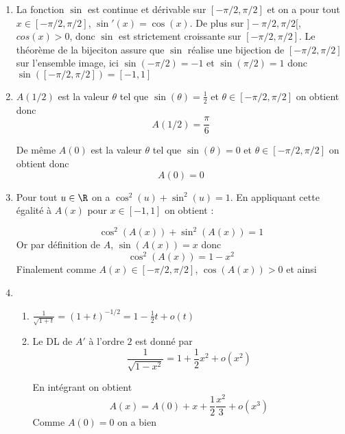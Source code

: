 \documentclass[a4paper, 11pt,reqno]{article}
\begin{document}
\begin{correction}
\begin{enumerate}
\item  La fonction $\sin$ est continue et dérivable sur $[-\pi/2,\pi/2]$ et on a pour tout $x\in [-\pi/2,\pi/2]$, $\sin'(x) =\cos(x)$. De plus sur $]-\pi/2,\pi/2[$, $cos(x)> 0$, donc $\sin$ est strictement croissante sur $[-\pi/2,\pi/2]$. 
Le théorème de la bijeciton assure que $\sin$ réalise une bijection de $[-\pi/2,\pi/2]$  sur l'ensemble image, ici $\sin(-\pi/2) =-1$ et $\sin(\pi/2) =1$ 
donc $\sin([-\pi/2,\pi/2] ) =[-1,1]$ 
\item $A(1/2)$ est la valeur $\theta$ tel que $\sin(\theta) =\frac{1}{2}$ et $\theta \in [-\pi/2,\pi/2]$ on obtient donc 
$$A(1/2) =\frac{\pi}{6}$$

De  même $A(0)$ est la valeur $\theta$ tel que $\sin(\theta) =0$ et $\theta \in [-\pi/2,\pi/2]$ on obtient donc 
$$A(0) =0$$

\item Pour tout $u\in \R$ on a $\cos^2(u)+\sin^2(u)=1$. En appliquant cette égalité à $A(x)$ pour $x\in [-1,1]$ on obtient :

$$\cos^2(A(x)) +\sin^2(A(x))=1$$
Or par définition de $A$, $\sin(A(x))=x$ donc 
$$\cos^2(A(x)) = 1-x^2$$
Finalement comme $A(x)\in [-\pi/2,\pi/2]$, $\cos(A(x))>0$ et ainsi 

\item
\begin{enumerate}
\item $\frac{1}{\sqrt{1+t}} = (1+t)^{-1/2} = 1-\frac{1}{2} t+o(t)$ 
\item 
Le DL de $A'$ à l'ordre $2$ est donné par 
$$\frac{1}{\sqrt{1-x^2}} =1+\frac{1}{2}x^2+o(x^2)$$

En intégrant on obtient 
$$A(x) =A(0)+x+ \frac{1}{2}\frac{x^2}{3} +o(x^3)$$
Comme $A(0) =0$ on a bien

 
\end{enumerate}

\end{enumerate}
\end{correction}
\vspace{1cm}


\end{document}
